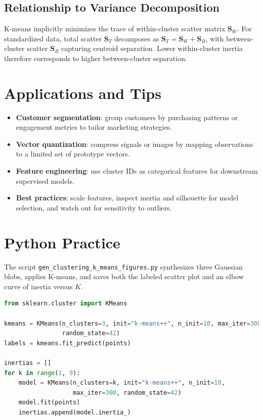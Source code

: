 ﻿\documentclass[12pt]{article}
\begin{document}
\subsection{Relationship to Variance Decomposition}
K-means implicitly minimizes the trace of within-cluster scatter matrix \(\mathbf{S}_W\). For standardized data, total scatter \(\mathbf{S}_T\) decomposes as \(\mathbf{S}_T = \mathbf{S}_W + \mathbf{S}_B\), with between-cluster scatter \(\mathbf{S}_B\) capturing centroid separation. Lower within-cluster inertia therefore corresponds to higher between-cluster separation.

\section{Applications and Tips}
\begin{itemize}
  \item \textbf{Customer segmentation}: group customers by purchasing patterns or engagement metrics to tailor marketing strategies.
  \item \textbf{Vector quantization}: compress signals or images by mapping observations to a limited set of prototype vectors.
  \item \textbf{Feature engineering}: use cluster IDs as categorical features for downstream supervised models.
  \item \textbf{Best practices}: scale features, inspect inertia and silhouette for model selection, and watch out for sensitivity to outliers.
\end{itemize}

\section{Python Practice}
The script \texttt{gen\_clustering\_k\_means\_figures.py} synthesizes three Gaussian blobs, applies K-means, and saves both the labeled scatter plot and an elbow curve of inertia versus \(K\).
\begin{lstlisting}[language=Python,caption={Excerpt from gen_clustering_k_means_figures.py}]
from sklearn.cluster import KMeans

kmeans = KMeans(n_clusters=3, init="k-means++", n_init=10, max_iter=300,
                random_state=42)
labels = kmeans.fit_predict(points)

inertias = []
for k in range(1, 9):
    model = KMeans(n_clusters=k, init="k-means++", n_init=10,
                   max_iter=300, random_state=42)
    model.fit(points)
    inertias.append(model.inertia_)
\end{lstlisting}
\end{document}

